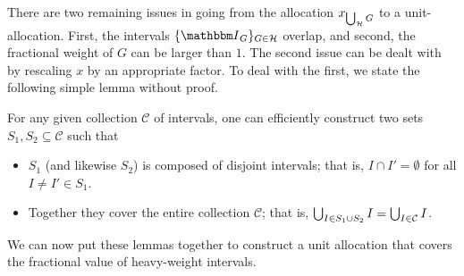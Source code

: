 There are two remaining issues in going from the allocation $x_{\bigcup_{\mathcal{H}}
G}$ to a unit-allocation. First, the intervals $\{\Int_G\}_{G\in\heavy}$
overlap, and second, the fractional weight of $G$ can be larger than $1$. The
second issue can be dealt with by rescaling $x$ by an appropriate factor. To
deal with the first, we state the following simple lemma without proof.
\begin{lemma}
    \label{lem:interval-cover}
    For any given collection $\mathcal C$ of intervals, one can efficiently
    construct two sets $S_1, S_2\subseteq \mathcal C$ such that 
    \begin{itemize}
        \item $S_1$ (and likewise $S_2$) is composed of disjoint intervals;
            that is, $I\cap I' = \emptyset$ for all $I\ne I'\in S_1$.
        \item Together they cover the entire collection $\mathcal C$; that is,
            $\bigcup_{I\in S_1\cup S_2} I = \bigcup_{I\in\mathcal C} I$.
    \end{itemize}
\end{lemma}

We can now put these lemmas together to construct a unit allocation that covers the fractional value of heavy-weight intervals.

